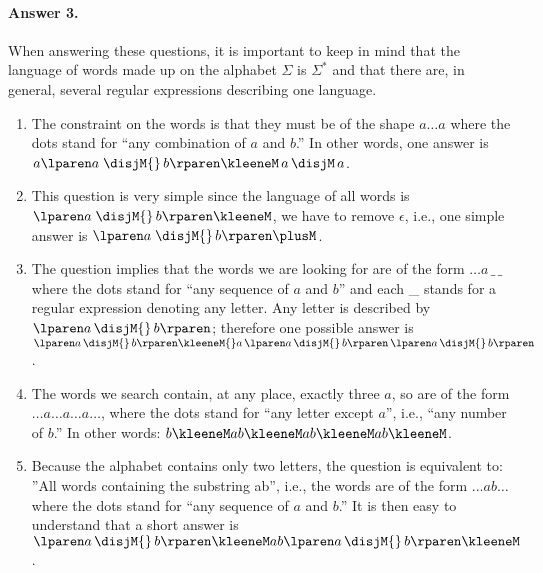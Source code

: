 \paragraph{Answer 3.} When answering these questions, it is important to keep in
    mind that the language of words made up on the alphabet \(\Sigma\)
    is \(\Sigma^{*}\) and that there are, in general, several regular
    expressions describing one language.

\begin{enumerate}

  \item The constraint on the words is that they must be of the shape
    \(a \ldots a\) where the dots stand for ``any combination of \(a\)
    and \(b\).'' In other words, one answer is \(a \lparen a \;
    \disjM{} \, b\rparen\kleeneM \, a \, \disjM \, a\).

  \item This question is very simple since the language of all words
    is \(\lparen a \; \disjM{} \, b\rparen\kleeneM\), we have to
    remove \(\epsilon\), i.e., one simple answer is \(\lparen a \;
    \disjM{} \, b\rparen\plusM\).

  \item The question implies that the words we are looking for are of
    the form \(\ldots a \, \_ \, \_\) where the dots stand for ``any
    sequence of \(a\) and \(b\)'' and each \_ stands for a regular
    expression denoting any letter. Any letter is described by
    \(\lparen a \, \disjM{} \, b\rparen\); therefore one possible
    answer is \(\lparen a \, \disjM{} \, b\rparen\kleeneM{} a \,
    \lparen a \, \disjM{} \, b\rparen \, \lparen a \, \disjM{} \,
    b\rparen\).

  \item The words we search contain, at any place, exactly three
    \(a\), so are of the form \(\ldots a \ldots a \ldots a \ldots\),
    where the dots stand for ``any letter except \(a\)'', i.e., ``any
    number of \(b\).'' In other words: \(b\kleeneM a b\kleeneM a
    b\kleeneM a b\kleeneM\).

  \item Because the alphabet contains only two letters, the question
    is equivalent to: ''All words containing the substring ab'', i.e.,
    the words are of the form \(\ldots ab \ldots\) where the dots
    stand for ``any sequence of \(a\) and \(b\).'' It is then easy to
    understand that a short answer is \(\lparen a \, \disjM{} \,
    b\rparen\kleeneM ab \lparen a \, \disjM{} \, b\rparen\kleeneM\).


\end{enumerate}
